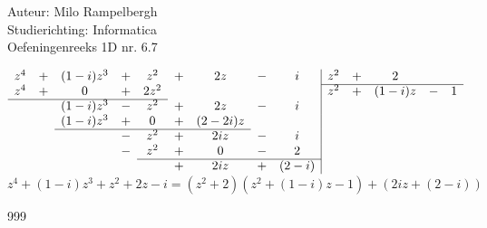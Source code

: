 \documentclass[a4paper]{article}
\begin{document}
\noindent \large Auteur: Milo Rampelbergh \\
\noindent \large Studierichting: Informatica\\
\noindent \large Oefeningenreeks 1D nr. 6.7\\

\medskip

\normalsize



$\begin{array}{ccccccccc|ccccc}
z^4  &  +  &  (1-i)z^3  &  +  &  z^2  &  +  &  2z     &  -  &  i  &  z^2  &  +  &  2  \\
\cline{10-14}
z^4  &  +  &         0       &  +  &  2z^2&      &            &     &     &   z^2  &  +   &   (1-i)z & - & 1   \\
\cline{1-5}
         &       &  (1-i)z^3  &  -  &  z^2  &   +  & 2z      & -   &  i   &           &      &      \\
         &       &  (1-i)z^3  &  +  &   0    &   +  &(2-2i)z&     &      &           &      &      \\
\cline{3-7}
         &       &                   &  -   &z^2   &   +  &2iz      & -   &   i  &           &      &      \\
         &       &                   &  -   &z^2   &   +  &0         & -   &  2  &           &      &      \\
\cline{5-9}
         &       &                   &      &          &   +  &2iz      & +  &(2-i)&           &      &      \\
\end{array}$\\

$ z^4 + (1-i)z^3 + z^2 + 2z - i = (z^2 + 2)(z^2 + (1-i)z - 1) + (2iz + (2 - i))$

\begin{thebibliography}{999}
\end{thebibliography}
\end{document}

